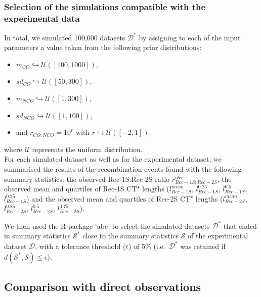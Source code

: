 \subsubsection{Selection of the simulations compatible with the experimental data}
In total, we simulated 100,000 datasets $\mathcal{D^{*}}$ by assigning to each of the input parameters a value taken from the following prior distributions: 
\begin{itemize}
    \item $m_{CO} \hookrightarrow \mathcal{U}([100, 1000])$, 
    \item $sd_{CO} \hookrightarrow \mathcal{U}([50, 300])$,
    \item $m_{NCO} \hookrightarrow \mathcal{U}([1, 300])$, 
    \item $sd_{NCO} \hookrightarrow \mathcal{U}([1, 100])$,
    \item and $r_{CO:NCO} = 10^{r}$ with $r \hookrightarrow \mathcal{U}([-2, 1])$,
\end{itemize}
where $\mathcal{U}$ represents the uniform distribution.\\

For each simulated dataset as well as for the experimental dataset, we summarised the results of the recombination events found with the following summary statistics: the observed Rec-1S:Rec-2S ratio $r_{Rec-1S:Rec-2S}^{obs}$, the observed mean and quartiles of Rec-1S CT\textsuperscript{$\star$} lengths ($l_{Rec-1S}^{mean}$, $l_{Rec-1S}^{0.25}$, $l_{Rec-1S}^{0.5}$, $l_{Rec-1S}^{0.75}$) and the observed mean and quartiles of Rec-2S CT\textsuperscript{$\star$} lengths ($l_{Rec-2S}^{mean}$, $l_{Rec-2S}^{0.25}$, $l_{Rec-2S}^{0.5}$, $l_{Rec-2S}^{0.75}$). 

We then used the R package ‘abc’ \citep{csillery2012abc} to select the simulated datasets $\mathcal{D^{*}}$ that ended in summary statistics $\mathcal{S^{*}}$ close to the summary statistics $\mathcal{S}$ of the experimental dataset $\mathcal{D}$, with a tolerance threshold ($\epsilon$) of 5\% (i.e.\ $\mathcal{D^{*}}$ was retained if $d(\mathcal{S^{*}}, \mathcal{S}) \leq \epsilon$). 





\subsection{Comparison with direct observations}


